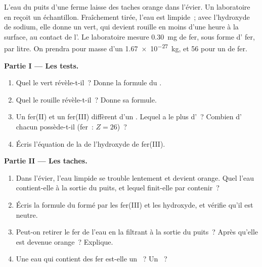 \begin{problem}
\label{pb:g9:ions:1}
L'eau du puits d'une ferme laisse des taches orange dans l'évier. Un
laboratoire en reçoit un échantillon. Fraîchement tirée, l'eau est
limpide~; avec l'hydroxyde de sodium, elle donne un  vert, qui
devient rouille en moins d'une heure à la surface, au contact de l'.
Le laboratoire mesure \qty{0.30}{mg} de fer, sous forme d' fer, par
litre. On prendra pour masse d'un  \qty{1.67e-27}{kg}, et
56  pour un  de fer.

\medskip
\noindent\textbf{Partie I --- Les tests.}
\begin{enumerate}
  \item Quel  le  vert révèle-t-il~? Donne la formule du
        .
  \item Quel  le  rouille révèle-t-il~? Donne sa formule.
  \item Un  fer(II) et un  fer(III) diffèrent d'un .
        Lequel a le plus d'~? Combien d' chacun
        possède-t-il (fer~: $Z = 26$)~?
  \item Écris l'équation de la  de l'hydroxyde de fer(III).
\end{enumerate}

\medskip
\noindent\textbf{Partie II --- Les taches.}
\begin{enumerate}[resume]
  \item Dans l'évier, l'eau limpide se trouble lentement et devient
        orange. Quel  l'eau contient-elle à la sortie du puits, et
        lequel finit-elle par contenir~?
  \item Écris la formule du  formé par les  fer(III)
        et les  hydroxyde, et vérifie qu'il est neutre.
  \item Peut-on retirer le fer de l'eau en la filtrant à la sortie du
        puits~? Après qu'elle est devenue orange~? Explique.
  \item Une eau qui contient des  fer est-elle un ~? Un
        ~?
\end{enumerate}


\end{problem}
